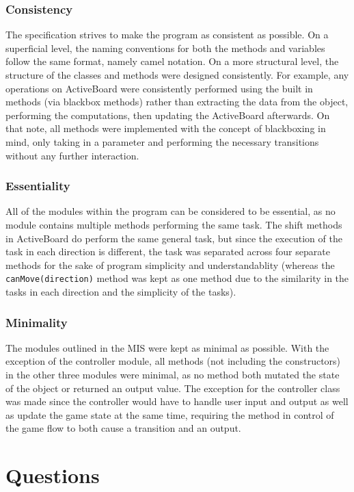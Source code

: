 \documentclass[12pt]{article}
\begin{document}
\subsubsection*{Consistency}
The specification strives to make the program as consistent as possible. On a superficial level, the naming conventions for both the methods and variables follow the same format, namely camel notation. On a more structural level, the structure of the classes and methods were designed consistently. For example, any operations on ActiveBoard were consistently performed using the built in methods (via blackbox methods) rather than extracting the data from the object, performing the computations, then updating the ActiveBoard afterwards. On that note, all methods were implemented with the concept of blackboxing in mind, only taking in a parameter and performing the necessary transitions without any further interaction.

\subsubsection*{Essentiality}
All of the modules within the program can be considered to be essential, as no module contains multiple methods performing the same task. The shift methods in ActiveBoard do perform the same general task, but since the execution of the task in each direction is different, the task was separated across four separate methods for the sake of program simplicity and understandablity (whereas the \texttt{canMove(direction)} method was kept as one method due to the similarity in the tasks in each direction and the simplicity of the tasks).

\subsubsection*{Minimality}
The modules outlined in the MIS were kept as minimal as possible. With the exception of the controller module, all methods (not including the constructors) in the other three modules were minimal, as no method both mutated the state of the object or returned an output value. The exception for the controller class was made since the controller would have to handle user input and output as well as update the game state at the same time, requiring the method in control of the game flow to both cause a transition and an output.

\newpage

\section*{Questions}
\end{document}
